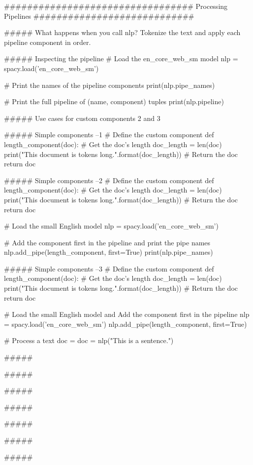 #################################   Processing Pipelines    ############################


##### What happens when you call nlp?
Tokenize the text and apply each pipeline component in order.

##### Inspecting the pipeline
# Load the en_core_web_sm model
nlp = spacy.load('en_core_web_sm')

# Print the names of the pipeline components
print(nlp.pipe_names)

# Print the full pipeline of (name, component) tuples
print(nlp.pipeline)


##### Use cases for custom components
2 and 3


##### Simple components  --1
# Define the custom component
def length_component(doc):
    # Get the doc's length
    doc_length = len(doc)
    print("This document is {} tokens long.".format(doc_length))
    # Return the doc
    return doc



##### Simple components --2
# Define the custom component
def length_component(doc):
    # Get the doc's length
    doc_length = len(doc)
    print("This document is {} tokens long.".format(doc_length))
    # Return the doc
    return doc

# Load the small English model
nlp = spacy.load('en_core_web_sm')
  
# Add the component first in the pipeline and print the pipe names
nlp.add_pipe(length_component, first=True)
print(nlp.pipe_names)



##### Simple components --3
# Define the custom component
def length_component(doc):
    # Get the doc's length
    doc_length = len(doc)
    print("This document is {} tokens long.".format(doc_length))
    # Return the doc
    return doc
  
# Load the small English model and Add the component first in the pipeline
nlp = spacy.load('en_core_web_sm')
nlp.add_pipe(length_component, first=True)

# Process a text
doc = doc = nlp("This is a sentence.")



#####




#####




#####




#####




#####




#####




#####




